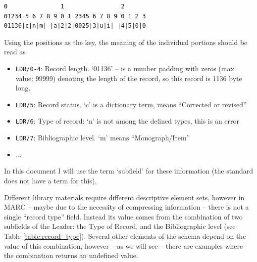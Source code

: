 \begin{small}
\begin{Verbatim}[samepage=true]
0               1                2
01234 5 6 7 8 9 0 1 2345 6 7 8 9 0 1 2 3
01136|c|n|m| |a|2|2|0025|3|u|i| |4|5|0|0
\end{Verbatim}
\end{small}

Using the positions as the key, the meaning of the individual portions should be read as
\begin{itemize}
 \setlength{\parskip}{0pt}
 \setlength{\itemsep}{0pt plus 1pt}
 \item \texttt{LDR/0-4}: Record length. `01136’ -- is a number padding with zeros (max. value: 99999) denoting the length of the record, so this record is 1136 byte long. 
 \item \texttt{LDR/5}: Record status. `c’ is a dictionary term, means ``Corrected or revised''
 \item \texttt{LDR/6}: Type of record: `n’ is not among the defined types, this is an error
 \item \texttt{LDR/7}: Bibliographic level. `m’ means ``Monograph/Item''
 \item ...
\end{itemize}

In this document I will use the term `subfield' for these information (the standard does not have a term for this).

Different library materials require different descriptive element sets, however in MARC -- maybe due to the necessity of compressing information -- there is not a single ``record type'' field. Instead its value comes from the combination of two subfields of the Leader: the Type of Record, and the Bibliographic level (see Table \ref{table:record_type}). Several other elements of the schema depend on the value of this combination, however -- as we will see -- there are examples where the combination returns an undefined value.

